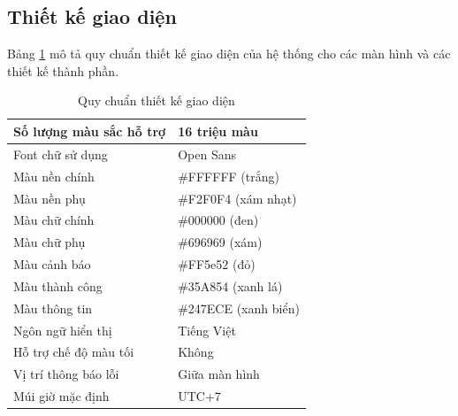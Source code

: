 \documentclass[../DoAn.tex]{subfiles}
\begin{document}
\subsection{Thiết kế giao diện}
\label{subsection:detaildesign-ui}
Bảng \ref{table:ui_standard} mô tả quy chuẩn thiết kế giao diện của hệ thống cho các màn hình và các thiết kế thành phần.
\begin{table}[H]
    \begin{tabularx}{\textwidth}{|l|X|}
        \hline
        Số lượng màu sắc hỗ trợ & 16 triệu màu         \\ \hline
        Font chữ sử dụng        & Open Sans            \\ \hline
        Màu nền chính           & \#FFFFFF (trắng)     \\ \hline
        Màu nền phụ             & \#F2F0F4 (xám nhạt)  \\ \hline
        Màu chữ chính           & \#000000 (đen)       \\ \hline
        Màu chữ phụ             & \#696969 (xám)       \\ \hline
        Màu cảnh báo            & \#FF5e52 (đỏ)        \\ \hline
        Màu thành công          & \#35A854 (xanh lá)   \\ \hline
        Màu thông tin           & \#247ECE (xanh biển) \\ \hline
        Ngôn ngữ hiển thị       & Tiếng Việt           \\ \hline
        Hỗ trợ chế độ màu tối   & Không                \\ \hline
        Vị trí thông báo lỗi    & Giữa màn hình        \\ \hline
        Múi giờ mặc định        & UTC+7                \\ \hline
    \end{tabularx}
    \caption{Quy chuẩn thiết kế giao diện}
    \label{table:ui_standard}
\end{table}
\end{document}
